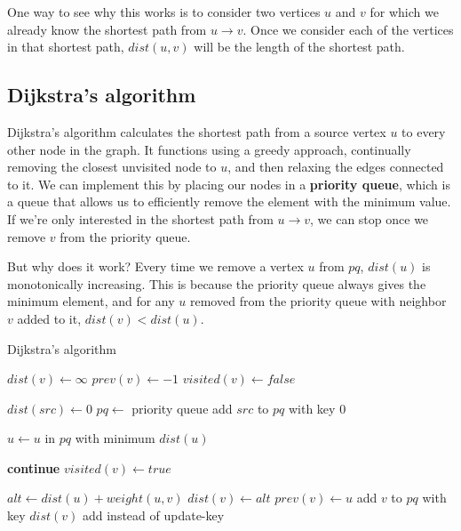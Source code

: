One way to see why this works is to consider two vertices $u$ and $v$ for which we already know the shortest path from $u \rightarrow v$. Once we consider each of the vertices in that shortest path, $dist(u,v)$ will be the length of the shortest path.

\subsection{Dijkstra's algorithm}
Dijkstra's algorithm calculates the shortest path from a source vertex $u$ to every other node in the graph. It functions using a greedy approach, continually removing the closest unvisited node to $u$, and then relaxing the edges connected to it. We can implement this by placing our nodes in a \textbf{priority queue}, which is a queue that allows us to efficiently remove the element with the minimum value. If we're only interested in the shortest path from $u \rightarrow v$, we can stop once we remove $v$ from the priority queue.

But why does it work? Every time we remove a vertex $u$ from $pq$, $dist(u)$ is monotonically increasing. This is because the priority queue always gives the minimum element, and for any $u$ removed from the priority queue with neighbor $v$ added to it, $dist(v) < dist(u)$.

\begin{algorithm}[H]
\caption{Dijkstra's algorithm}
\begin{algorithmic}

    \State $dist(v) \gets \infty$
    \State $prev(v) \gets -1$
    \State $visited(v) \gets false$
\EndFor

\State $dist(src) \gets 0$
\State $pq \gets$ priority queue
\State add $src$ to $pq$ with key $0$

    \State $u \gets u$ in $pq$ with minimum $dist(u)$
    
        \State \textbf{continue}
    \EndIf
    \State $visited(v) \gets true$

        \State $alt \gets dist(u) + weight(u, v)$
            \State $dist(v) \gets alt$
            \State $prev(v) \gets u$
            \State add $v$ to $pq$ with key $dist(v)$
            \Comment add instead of update-key
        \EndIf
    \EndFor
\EndWhile

\end{algorithmic}
\end{algorithm}


